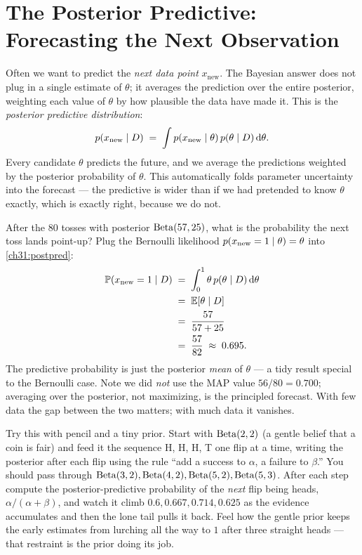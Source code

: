\section{The Posterior Predictive: Forecasting the Next Observation}
\label{ch31:predictive}

Often we want to predict the
\emph{next data point} $x_{\text{new}}$. The Bayesian answer does not plug in a single
estimate of $\theta$; it averages the prediction over the entire posterior, weighting each
value of $\theta$ by how plausible the data have made it. This is the \emph{posterior
predictive distribution}:
\begin{equation}
  p(x_{\text{new}}\mid D) \;=\; \int p(x_{\text{new}}\mid\theta)\,
       p(\theta\mid D)\,\mathrm{d}\theta.
  \label{ch31:postpred}
\end{equation}
Every candidate $\theta$ predicts the future, and we average the
predictions weighted by the posterior probability of $\theta$. This automatically folds parameter uncertainty
into the forecast --- the predictive is wider than if we had pretended to know $\theta$
exactly, which is exactly right, because we do not.

\begin{example}
\label{ch31:ex-postpred}
After the $80$ tosses with posterior $\operatorname{Beta}(57,25)$, what is the probability the next toss
lands point-up? Plug the Bernoulli likelihood $p(x_{\text{new}}=1\mid\theta)=\theta$ into
\eqref{ch31:postpred}:
\begin{align*}
  \operatorname{\mathbb{P}}(x_{\text{new}}=1\mid D) &\;=\; \int_0^1 \theta\,p(\theta\mid D)\,\mathrm{d}\theta \\
  &\;=\; \operatorname{\mathbb{E}}[\theta\mid D] \\
  &\;=\; \frac{57}{57+25} \\
  &\;=\; \frac{57}{82} \;\approx\; 0.695.
\end{align*}
The predictive probability is just the posterior \emph{mean} of $\theta$ --- a tidy result
special to the Bernoulli case. Note we did \emph{not} use the MAP value $56/80 = 0.700$;
averaging over the posterior, not maximizing, is the principled forecast. With few data the
gap between the two matters; with much data it vanishes.
\end{example}

\begin{labbox}
Try this with pencil and a tiny prior. Start with $\operatorname{Beta}(2,2)$ (a gentle belief that a coin
is fair) and feed it the sequence H, H, H, T one flip at a time, writing the posterior
after each flip using the rule ``add a success to $\alpha$, a failure to $\beta$.'' You
should pass through $\operatorname{Beta}(3,2),\operatorname{Beta}(4,2),\operatorname{Beta}(5,2),\operatorname{Beta}(5,3)$. After each step compute the
posterior-predictive probability of the \emph{next} flip being heads, $\alpha/(\alpha+\beta)$,
and watch it climb $0.6, 0.667, 0.714, 0.625$ as the evidence accumulates and then the lone
tail pulls it back. Feel how the gentle prior keeps the early estimates from lurching all
the way to $1$ after three straight heads --- that restraint is the prior doing its job.
\end{labbox}

